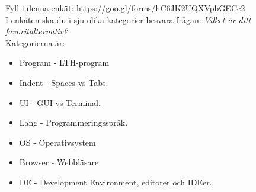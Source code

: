 \begin{Preparations}
\item {}
\item {}
\item \ReadTheLab
\item Fyll i denna enkät: \url{https://goo.gl/forms/hC6JK2UQXVpbGECc2}  \\
I enkäten ska du i sju olika kategorier besvara frågan: \textit{Vilket är ditt favoritalternativ?} \\
Kategorierna är:
\begin{itemize}[nolistsep,noitemsep]
\item Program - LTH-program
\item Indent - Spaces vs Tabs.
\item UI - GUI vs Terminal.
\item Lang - Programmeringsspråk.
\item OS - Operativsystem
\item Browser - Webbläsare
\item DE - Development Environment, editorer och IDEer.
\end{itemize}
\end{Preparations}


